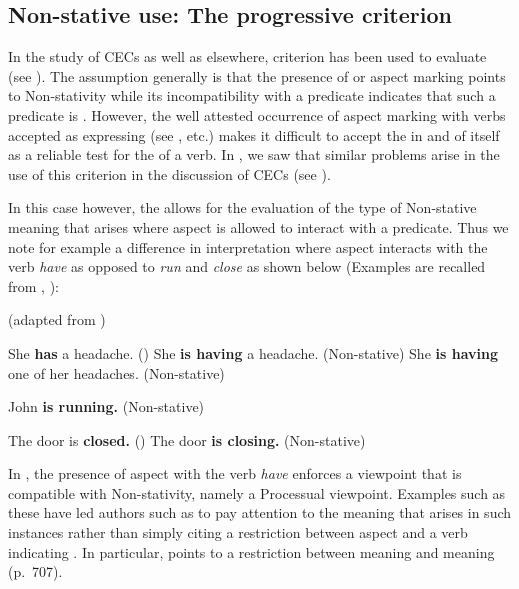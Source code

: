 \subsection{Non-stative use: The progressive criterion}\label{sec:5.1.1}

In the study of CECs as well as elsewhere,   criterion has been used to evaluate  (see \citealt{Jaganauth1987,Bickerton1975,Gooden2008}). The assumption generally is that the presence of  or  aspect marking points to Non-stativity while its incompatibility with a predicate indicates that such a predicate is . However, the well attested occurrence of  aspect marking with verbs accepted as expressing  (see \citealt{Verkuyl1993, Lyons1977,Smith1983,Smith1991}, etc.) makes it difficult to accept the  in and of itself as a reliable test for the  of a verb. In , we saw that similar problems arise in the use of this criterion in the discussion of CECs (see ). 

In this case however, the  allows for the evaluation of the type of Non-stative meaning that arises where  aspect is allowed to interact with a predicate. Thus we note for example a difference in interpretation where  aspect interacts with the verb \textit{have} as opposed to \textit{run} and \textit{close} as shown below (Examples are recalled from , ):


\ea%
 \label{ex:5:1} 
 (adapted from \citealt[707]{Lyons1977})

\ea She \textbf{has} a headache. ()
\ex She \textbf{is having} a headache. (Non-stative)
\ex She \textbf{is having} one of her headaches. (Non-stative)
\z
 \z

\ea%
 \label{ex:5:2}
 John \textbf{is running.} (Non-stative)
 \z

\ea%
 \label{ex:5:3}
\ea The door is \textbf{closed.} ()
\ex The door \textbf{is closing.} (Non-stative)
\z
 \z

In , the presence of  aspect with the  verb \textit{have} enforces a viewpoint that is compatible with Non-stativity, namely a Processual viewpoint. Examples such as these have led authors such as \citet{Lyons1977,Smith1983} to pay attention to the meaning that arises in such instances rather than simply citing a restriction between  aspect and a verb indicating . In particular, \citet{Lyons1977} points to a restriction between  meaning and  meaning (p.~707). 

